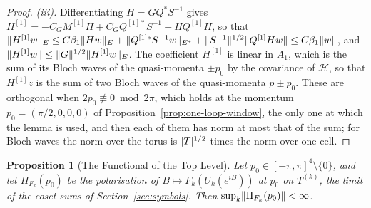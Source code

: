\documentclass[11pt]{preprint}
\DeclarePairedDelimiter{\abs}{\lvert}{\rvert}
\DeclarePairedDelimiter{\norm}{\lVert}{\rVert}
\numberwithin{equation}{section}
\theoremstyle{definition}
\theoremstyle{remark}
\theoremstyle{plain}
\newtheorem{auxproposition}[lemma]{Proposition}
\begin{document}
\begin{proof}
\emph{(iii).} Differentiating $H = GQ^*S^{-1}$ gives $H^{[1]} = -C_GM^{[1]}H + C_GQ^{[1]*}S^{-1} - HQ^{[1]}H$, so that $\norm{H^{[1]}w}_E \leq C\beta_1\norm{Hw}_E + \norm{Q^{[1]*}S^{-1}w}_{E^*} + \norm{S^{-1}}^{1/2}\norm{Q^{[1]}Hw} \leq C\beta_1\norm{w}$, and $\norm{H^{[1]}w} \leq \norm{G}^{1/2}\norm{H^{[1]}w}_E$. The coefficient $H^{[1]}$ is linear in $A_1$, which is the sum of its Bloch waves of the quasi-momenta $\pm p_0$ by the covariance of $\mathscr H$, so that $H^{[1]}z$ is the sum of two Bloch waves of the quasi-momenta $p \pm p_0$. These are orthogonal when $2p_0 \not\equiv 0 \bmod 2\pi$, which holds at the momentum $p_0 = (\pi/2, 0, 0, 0)$ of Proposition~\ref{prop:one-loop-window}, the only one at which the lemma is used, and then each of them has norm at most that of the sum; for Bloch waves the norm over the torus is $\abs{T}^{1/2}$ times the norm over one cell.
\end{proof}

\begin{auxproposition}[The Functional of the Top Level]\label{prop:top-level}
Let $p_0 \in [-\pi, \pi]^4 \setminus \{ 0 \}$, and let $\Pi_{F_k}(p_0)$ be the polarisation of $B \mapsto F_k(U_k(e^{iB}))$ at $p_0$ on $T^{(k)}$, the limit of the coset sums of Section~\ref{sec:symbols}. Then $\sup_k\norm{\Pi_{F_k}(p_0)} < \infty$.
\end{auxproposition}
\end{document}
